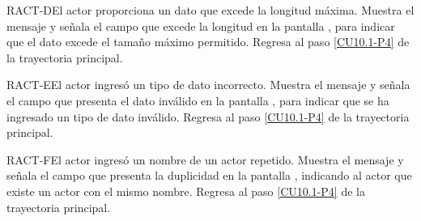 	\begin{UCtrayectoriaA}{RACT-D}{El actor proporciona un dato que excede la longitud máxima.}
		\UCpaso[\UCsist] Muestra el mensaje  y señala el campo que excede la longitud en la pantalla , para indicar que el dato excede el tamaño máximo permitido.
		\UCpaso Regresa al paso \ref{CU10.1-P4} de la trayectoria principal.
	\end{UCtrayectoriaA}

	\begin{UCtrayectoriaA}{RACT-E}{El actor ingresó un tipo de dato incorrecto.}
		\UCpaso[\UCsist] Muestra el mensaje  y señala el campo que presenta el dato inválido en la pantalla , para indicar que se ha ingresado un tipo de dato inválido.
		\UCpaso Regresa al paso \ref{CU10.1-P4} de la trayectoria principal.
	\end{UCtrayectoriaA}
	
	\begin{UCtrayectoriaA}{RACT-F}{El actor ingresó un nombre de un actor repetido.}
		\UCpaso[\UCsist] Muestra el mensaje  y señala el campo que presenta la duplicidad en la pantalla , indicando al actor que existe un actor con el mismo nombre.
		\UCpaso Regresa al paso \ref{CU10.1-P4} de la trayectoria principal.
	\end{UCtrayectoriaA}

